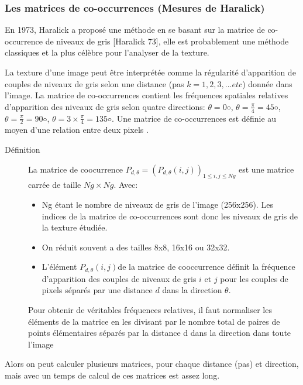 \subsubsection{Les matrices de co-occurrences (Mesures de Haralick)}

 En 1973, Haralick a proposé une méthode en se basant sur la matrice de co-occurrence de niveaux de gris [Haralick 73], elle est probablement une méthode classiques et la plus célèbre pour l'analyser de la texture.
 
 La texture d’une image peut être interprétée comme la régularité d’apparition de couples de niveaux de gris selon une distance (pas $k=1, 2, 3, ...etc$) donnée dans l’image. La matrice de co-occurrences contient les fréquences spatiales relatives d’apparition des niveaux
 de gris selon quatre directions: $\theta = 0◦$,  $\theta =  \frac{\pi}{4} = 45◦$,  $\theta =  \frac{\pi}{2} = 90◦$,  $\theta =  3 \times \frac{\pi}{4} = 135◦$. Une matrice de co-occurrences est définie au moyen d’une relation entre deux pixels .\\

\begin{description}
	\item[Définition] La matrice de coocurrence $P_{d,\theta}=(P_{d,\theta}(i, j))_{1\leq i,j \leq Ng}$ est une matrice carrée de taille $Ng \times Ng$. Avec:
	\begin{itemize}
		\item Ng étant le nombre de niveaux de gris de l'image (256x256). Les indices de la matrice de co-occurrences sont
		donc les niveaux de gris de la texture étudiée.
		\item On réduit souvent a des tailles 8x8, 16x16 ou 32x32.
		\item L’élément $P_{d,\theta}(i, j)$de la matrice de cooccurrence définit la fréquence d'apparition des couples de niveaux de gris $i$ et $j$ pour les couples de pixels séparés par une distance $d$ dans la direction $\theta$.
	\end{itemize} 
Pour obtenir de véritables fréquences relatives, il faut normaliser les éléments de la matrice en les divisant par
le nombre total de paires de points élémentaires séparés par la distance d dans la direction dans toute l’image
 
\end{description}

Alors on peut calculer plusieurs matrices, pour chaque distance (pas) et direction, mais avec un temps de calcul de ces matrices est assez long.

